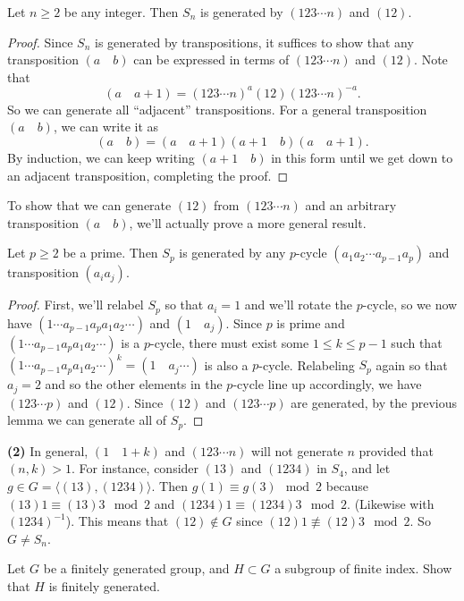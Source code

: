 \documentclass[11pt,letterpaper]{article}
\begin{document}
\begin{lemma}
  Let $n\geq 2$ be any integer. Then $S_n$ is generated by $(123\cdots n)$ and $(12)$.  
\end{lemma}
\begin{proof}
Since $S_n$ is generated by transpositions, it suffices to show that any transposition $(a\quad b)$ can be expressed in terms of $(123\cdots n)$ and $(12)$. Note that
\[
  (a\quad a+1)=(123\cdots n)^a(12)(123\cdots n)^{-a}
.\] 
So we can generate all ``adjacent'' transpositions. For a general transposition $(a\quad b)$, we can write it as
\[
  (a\quad b)=(a\quad a+1)(a+1\quad b)(a\quad a+1)
.\]
By induction, we can keep writing $(a+1\quad b)$ in this form until we get down to an adjacent transposition, completing the proof.    
\end{proof}

To show that we can generate $(12)$ from $(123\cdots n)$ and an arbitrary transposition $(a\quad b)$, we'll actually prove a more general result.

\begin{proposition}
  Let $p\geq 2$ be a prime. Then $S_p$ is generated by any $p$-cycle $(a_1 a_2\cdots a_{p-1} a_p)$ and transposition $(a_i a_j)$.    
\end{proposition}
\begin{proof}
  First, we'll relabel $S_p$ so that $a_i=1$ and we'll rotate the $p$-cycle, so we now have $(1\cdots a_{p-1}a_{p}a_1 a_2\cdots )$ and $(1\quad a_j)$. Since $p$ is prime and $(1\cdots a_{p-1}a_{p}a_1 a_2\cdots )$ is a $p$-cycle, there must exist some $1\leq k \leq p-1$ such that $(1\cdots a_{p-1}a_{p}a_1 a_2\cdots )^k=(1 \quad a_j \cdots)$ is also a $p$-cycle. Relabeling $S_p$ again so that $a_j=2$ and so the other elements in the $p$-cycle line up accordingly, we have $(123\cdots p)$ and $(12)$. Since $(12)$ and $(123\cdots p)$ are generated, by the previous lemma we can generate all of $S_p$.        
\end{proof}

\textbf{(2)} In general, $(1\quad 1+k)$ and $(123\cdots n)$ will not generate $n$ provided that $(n,k)>1$. For instance, consider $(13)$ and $(1234)$ in $S_4$, and let $g\in G= \big\langle (13), (1234)\big\rangle$. Then $g(1)\equiv g(3)\mod 2$ because $(13)1\equiv (13)3\mod 2$ and $(1234)1\equiv (1234)3\mod 2$. (Likewise with $(1234)^{-1}$). This means that $(12)\notin G$ since $(12)1\not\equiv (12)3\mod 2$. So $G\neq S_n$.                 

\pagebreak
\begin{problem}
  Let $G$ be a finitely generated group, and $H \subset G$ a subgroup of finite index. Show that $H$ is finitely generated.
\end{problem}
\end{document}
